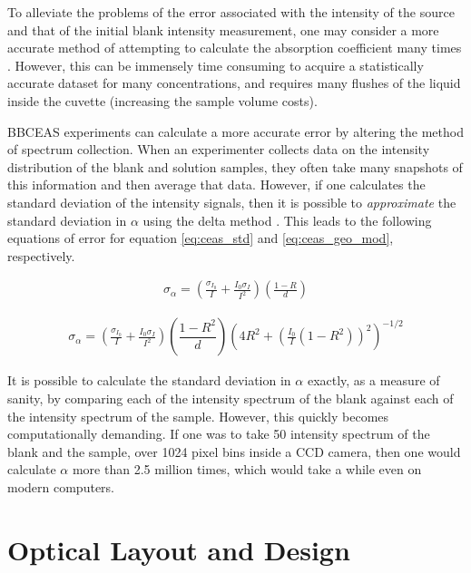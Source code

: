 To alleviate the problems of the error associated with the intensity of the
source and that of the initial blank intensity measurement, one may consider a
more accurate method of attempting to calculate the absorption coefficient many
times \cite{Islam:2007ea}. However, this can be immensely time consuming to
acquire a statistically accurate dataset for many concentrations, and requires
many flushes of the liquid inside the cuvette (increasing the sample volume
costs).

\ac{BBCEAS} experiments can calculate a more accurate error by altering the
method of spectrum collection. When an experimenter collects data on the
intensity distribution of the blank and solution samples, they often take many
snapshots of this information and then average that data. However, if one
calculates the standard deviation of the intensity signals, then it is possible
to \emph{approximate} the standard deviation in $\alpha$ using the delta method
\cite{Casella:2002tp}. This leads to the following equations of error for
equation \eqref{eq:ceas_std} and \eqref{eq:ceas_geo_mod}, respectively.

    \begin{align}
      \sigma_\alpha = \left(\frac{\sigma_{I_0}}{I} +
             \frac{I_0\sigma_I}{I^2}\right)
            \left(\frac{1-R}{d}\right)\label{eq:ceas_err_std}
    \end{align}


    \begin{align}
      \sigma_\alpha = \left(\frac{\sigma_{I_0}}{I} +
             \frac{I_0\sigma_I}{I^2}\right)
            \left(\dfrac{1-R^2}{d}\right)\left(4R^2+\left(
                                     \frac{I_0}{I}(1-R^2)\right)^2
                                     \right)^{-1/2}\label{eq:ceas_err_geo}
    \end{align}

It is possible to calculate the standard deviation in $\alpha$ exactly, as a
measure of sanity, by comparing each of the intensity spectrum of the
blank against each of the intensity spectrum of the sample. However, this
quickly becomes computationally demanding. If one was to take 50
intensity spectrum of the blank and the sample, over 1024 pixel bins inside a
CCD camera, then one would calculate $\alpha$ more than 2.5 million times,
which would take a while even on modern computers.



\section{Optical Layout and Design}\label{sec:optical_layout}

